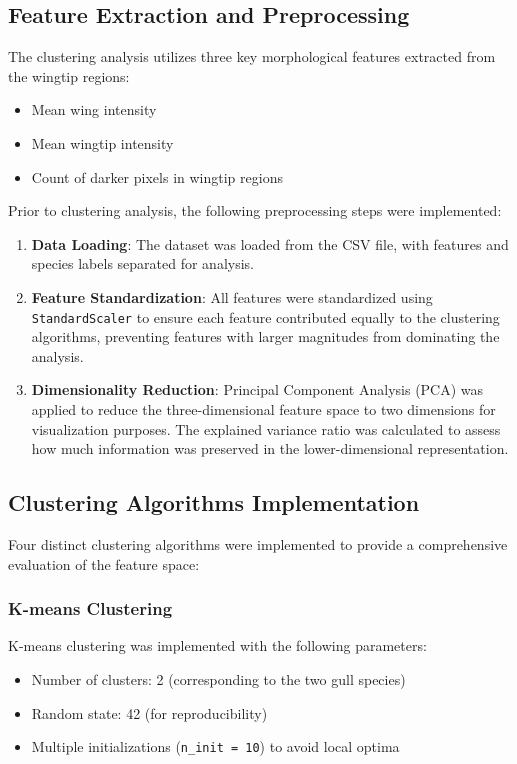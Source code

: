 \documentclass[a4paper,12pt]{report}
\begin{document}
\subsection{Feature Extraction and Preprocessing}

The clustering analysis utilizes three key morphological features extracted from the wingtip regions:
\begin{itemize}
    \item Mean wing intensity
    \item Mean wingtip intensity
    \item Count of darker pixels in wingtip regions
\end{itemize}

Prior to clustering analysis, the following preprocessing steps were implemented:
\begin{enumerate}
    \item \textbf{Data Loading}: The dataset was loaded from the CSV file, with features and species labels separated for analysis.
    \item \textbf{Feature Standardization}: All features were standardized using \texttt{StandardScaler} to ensure each feature contributed equally to the clustering algorithms, preventing features with larger magnitudes from dominating the analysis.
    \item \textbf{Dimensionality Reduction}: Principal Component Analysis (PCA) was applied to reduce the three-dimensional feature space to two dimensions for visualization purposes. The explained variance ratio was calculated to assess how much information was preserved in the lower-dimensional representation.
\end{enumerate}

\subsection{Clustering Algorithms Implementation}

Four distinct clustering algorithms were implemented to provide a comprehensive evaluation of the feature space:

\subsubsection{K-means Clustering}
K-means clustering was implemented with the following parameters:
\begin{itemize}
    \item Number of clusters: 2 (corresponding to the two gull species)
    \item Random state: 42 (for reproducibility)
    \item Multiple initializations (\texttt{n\_init = 10}) to avoid local optima
\end{itemize}
\end{document}
